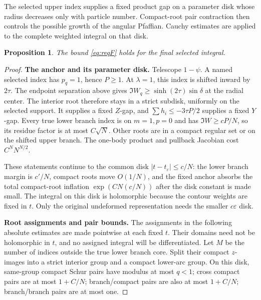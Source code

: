 \documentclass[11pt]{article}
\numberwithin{equation}{section}
\newtheorem{proposition}[theorem]{Proposition}
\theoremstyle{definition}
\newcommand{\eps}{\varepsilon}
\newcommand{\se}{t_\varepsilon}
\begin{document}
The selected upper index supplies a fixed product gap on a parameter
disk whose radius decreases only with particle number. Compact-root
pair contraction then controls the possible growth of the angular
Pfaffian. Cauchy estimates are applied to the complete weighted
integral on that disk.
\begin{proposition}\label{prop:F}
The bound \eqref{eq:reqF} holds for the final selected integral.
\end{proposition}
\begin{proof}
\noindent\textbf{The anchor and its parameter disk.} Telescope \(1-\psi\). A named selected index has \(p_q=1\), hence \(P\ge1\).
At \(\lambda=1\), this index is shifted inward by \(2\tau\).
The endpoint separation above gives
\(\Im W_q\ge\sinh(2\tau)\sin\delta\) at the radial center.
The interior root therefore stays in a strict subdisk, uniformly
on the selected support. It supplies a fixed \(Z\)-gap, and
\(\sum h_i\le-3\tau P/2\) supplies a fixed \(Y\)-gap.
Every true lower branch index is on \(m=1,p=0\) and has
\(\Im W\ge cP/N\), so its residue factor is at most \(C\sqrt N\).
Other roots are in a compact regular set or on the shifted upper
branch. The one-body product and pullback Jacobian cost
\(C^N N^{N/2}\).

These statements continue to the common disk \(|t-\se|\le c/N\):
the lower branch margin is \(c'/N\), compact roots move \(O(1/N)\),
and the fixed anchor absorbs the total compact-root inflation
\(\exp(CN(c/N))\) after the disk constant is made small.
The integral on this disk is holomorphic because the contour weights
are fixed in \(t\). Only the original undeformed representation needs
the smaller \(c\eps\) disk.

\par\smallskip\noindent\textbf{Root assignments and pair bounds.} The assignments in the following absolute estimates are made
pointwise at each fixed \(t\). Their domains need not be holomorphic
in \(t\), and no assigned integral will be differentiated.
Let \(M\) be the number of indices outside the true lower branch core.
Split their compact \(z\)-images into a strict interior group and a
compact lower-arc group. On this disk, same-group compact Schur
pairs have modulus at most \(q<1\); cross compact pairs are at most
\(1+C/N\); branch/compact pairs are also at most \(1+C/N\);
branch/branch pairs are at most one.


\end{proof}
\end{document}
